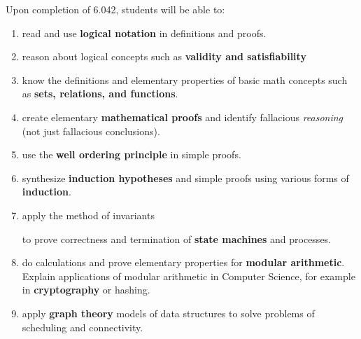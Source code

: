 \documentclass[handout]{mcs}
\begin{document}
Upon completion of 6.042, students will be able to:
\begin{enumerate}

\item \label{basic} read and use \textbf{logical notation} in
  definitions and proofs. \hfill \brule{0.5in}

\item \label{logic} reason about logical
  concepts such as \textbf{validity and satisfiability} \hfill \brule{0.5in}

\item \label{sets} know the definitions and elementary properties of
  basic math concepts such as \textbf{sets, relations, and
    functions}. \hfill \brule{0.5in}


\item \label{proofs} create elementary \textbf{mathematical
proofs} and identify fallacious \emph{reasoning} (not just fallacious
conclusions).  \hfill \brule{0.5in}

\item \label{well ordering principle} use the \textbf{well ordering
  principle} in simple proofs.  \hfill \brule{0.5in}

\item \label{induction} synthesize \textbf{induction hypotheses} and
  simple proofs using various forms of \textbf{induction}.  \hfill
  \brule{0.5in}

\item \label{invariants} apply the method of invariants
\iffalse and well-ordering\fi
to prove correctness and termination of \textbf{state
    machines} and processes.  \hfill \brule{0.5in}

\iffalse

\item \label{structural induction} find simple proofs using
  \textbf{structural induction}.  \hfill \brule{0.5in}
\fi

\item \label{arithmetic} do calculations and prove elementary
  properties for \textbf{modular arithmetic}.  Explain applications of
  modular arithmetic in Computer Science, for example in
  \textbf{cryptography} or hashing.\hfill \brule{0.5in}

\item \label{graphs} apply \textbf{graph theory} models of data
  structures to solve problems of scheduling and connectivity.  \hfill
  \brule{0.5in}


\end{enumerate}
\end{document}
